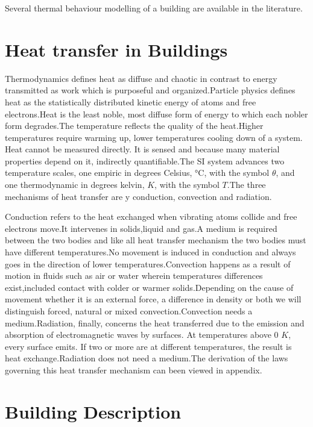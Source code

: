 \documentclass[a4paper,12pt]{article}
\numberwithin{equation}{section}
\begin{document}
Several thermal behaviour modelling of a building are available in the literature.



\newpage

\section{Heat transfer in Buildings}
Thermodynamics defines heat as diffuse and chaotic in contrast to energy transmitted as work which is purposeful and organized.Particle physics defines heat as the statistically distributed kinetic energy of atoms and free electrons.Heat is the least noble, most diffuse form of energy to which each nobler form degrades.The temperature reflects the quality of the heat.Higher temperatures require warming up, lower temperatures cooling down of a system. Heat cannot be
measured directly. It is sensed and because many material properties depend on it, indirectly quantifiable.The SI system advances two temperature scales, one empiric in degrees Celsius, °C,
with the symbol $\theta$, and one thermodynamic in degrees kelvin, $K$, with the symbol $T$.The three mechanisms of heat transfer are y conduction, convection and radiation.

Conduction refers to the heat exchanged when vibrating atoms collide and free electrons move.It intervenes in solids,liquid and gas.A medium is required between the two bodies and like all heat transfer mechanism the two bodies must have different temperatures.No movement is induced in conduction and always goes in the direction of lower temperatures.Convection happens as a result of motion in  fluids such as air or water wherein temperatures differences exist,included contact with colder or warmer solids.Depending on the cause of movement whether it is an external force, a difference in density or both we will distinguish forced, natural or mixed convection.Convection needs a medium.Radiation, finally, concerns the heat transferred due to the emission and absorption of electromagnetic waves by surfaces. At temperatures above 0 $K$, every surface emits. If two or more are at different temperatures, the result is heat exchange.Radiation does not need a medium.The derivation of the laws governing this heat transfer mechanism can been viewed in appendix.

\newpage
\section{Building Description}
\newpage
\end{document}
